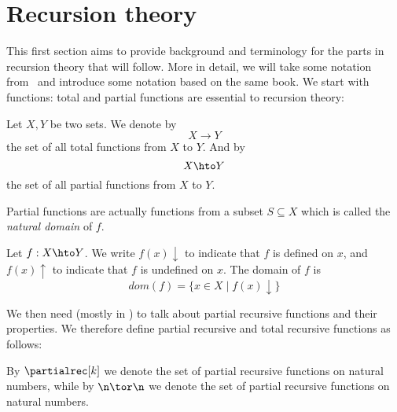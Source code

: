 \section{Recursion theory}\label{sec:recursionth}
This first section aims to provide background and terminology for the
parts in recursion theory that will follow. More in detail, we will
take some notation from~\cite{cutland1980computability} and introduce
some notation based on the same book.  We start with functions: total
and partial functions are essential to recursion theory:

\begin{definition}
  Let \(X,Y\) be two sets. We denote by \[X \to Y\] the set of all
  total functions from \(X\) to \(Y\).  And by
  \[X \hto Y\] the set of all partial functions from \(X\) to
  \(Y\).
\end{definition}
\noindent

Partial functions are actually functions from a subset
\(S \subseteq X\) which is called the \emph{natural domain} of \(f\).

\begin{definition}
  Let \(f : X \hto Y\). We write \(f(x)\downarrow\) to indicate that
  \(f\) is defined on \(x\), and \(f(x)\uparrow\) to indicate that
  \(f\) is undefined on \(x\). The domain of \(f\) is
  \[dom(f) = \{x \in X \mid f(x)\downarrow\}\]
\end{definition}



We then need (mostly in ) to talk about
partial recursive functions and their properties. We therefore define
partial recursive and total recursive functions as follows:

\begin{notation}\label{bg:partialrec}
  By \(\partialrec[k]\) we denote the set of partial recursive
  functions on natural numbers, while by \(\n \tor \n\) we denote the
  set of partial recursive functions on natural numbers.
\end{notation}


